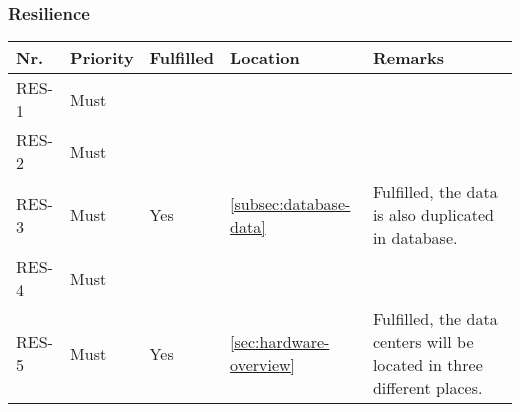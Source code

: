 	\subsubsection{Resilience}
	\begin{table}[H]
	\begin{tabular}{lllll}
	
	Nr.   & Priority & Fulfilled & Location & Remarks \\ \hline
	
	
	RES-1 & Must     & ~        & ~         & ~       \\ 
	
	
	RES-2 & Must     & ~        & ~         & ~       \\ 
	
	RES-3 & Must     & Yes        & \ref{subsec:database-data}         & Fulfilled, the data is also duplicated in database.       \\ 
	
	RES-4 & Must     & ~        & ~         & ~       \\ 
	
	RES-5 & Must     & Yes        & \ref{sec:hardware-overview}         & Fulfilled, the data centers will be located in three different places.       \\
	
	\end{tabular}
	\end{table}
	
